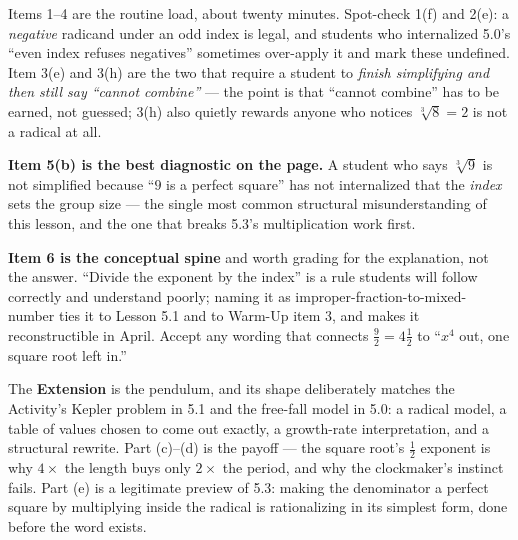 \documentclass[10pt]{article}
\begin{document}
\begin{teachernote}
Items 1--4 are the routine load, about twenty minutes. Spot-check 1(f) and 2(e): a \emph{negative}
radicand under an odd index is legal, and students who internalized 5.0's ``even index refuses
negatives'' sometimes over-apply it and mark these undefined. Item 3(e) and 3(h) are the two that
require a student to \emph{finish simplifying and then still say ``cannot combine''} --- the point is
that ``cannot combine'' has to be earned, not guessed; 3(h) also quietly rewards anyone who notices
$\sqrt[3]{8}=2$ is not a radical at all.

\textbf{Item 5(b) is the best diagnostic on the page.} A student who says $\sqrt[3]{9}$ is not
simplified because ``$9$ is a perfect square'' has not internalized that the \emph{index} sets the
group size --- the single most common structural misunderstanding of this lesson, and the one that
breaks 5.3's multiplication work first.

\textbf{Item 6 is the conceptual spine} and worth grading for the explanation, not the answer.
``Divide the exponent by the index'' is a rule students will follow correctly and understand
poorly; naming it as improper-fraction-to-mixed-number ties it to Lesson 5.1 and to Warm-Up item 3,
and makes it reconstructible in April. Accept any wording that connects $\frac92=4\frac12$ to
``$x^{4}$ out, one square root left in.''

The \textbf{Extension} is the pendulum, and its shape deliberately matches the Activity's Kepler
problem in 5.1 and the free-fall model in 5.0: a radical model, a table of values chosen to come
out exactly, a growth-rate interpretation, and a structural rewrite. Part (c)--(d) is the payoff ---
the square root's $\frac12$ exponent is why $4\times$ the length buys only $2\times$ the period, and
why the clockmaker's instinct fails. Part (e) is a legitimate preview of 5.3: making the
denominator a perfect square by multiplying inside the radical is rationalizing in its simplest
form, done before the word exists.
\end{teachernote}
\end{document}
